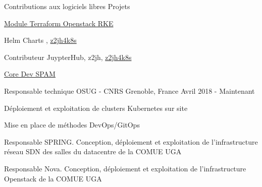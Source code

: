 

\begin{cventries}

  \cventry
    {Contributions aux logiciels libres} %
    {Projets}
    {}
    {}
    {
      \begin{cvitems} %
        \item {\href{https://github.com/remche/terraform-openstack-rke}{Module Terraform Openstack RKE \faGithub}}
        \item {Helm Charts \href{https://github.com/remche/zero-to-shinyproxy}, \href{https://github.com/remche/z2jh4k8s}{z2jh4k8s \faGithub}}
        \item {Contributeur JuypterHub, z2jh, \href{https://github.com/remche/z2jh4k8s}{z2jh4k8s \faGithub}}
        \item {\href{https://ttk.gricad-pages.univ-grenoble-alpes.fr/spam/intro.html}{Core Dev SPAM \faGlobe}}
      \end{cvitems}
    }

  \cventry
    {Responsable technique} %
    {OSUG - CNRS} %
    {Grenoble, France} %
    {Avril 2018 - Maintenant} %
    {
      \begin{cvitems} %
        \item {Déploiement et exploitation de clusters Kubernetes sur site}
        \item {Mise en place de méthodes DevOps/GitOps}
        \item {Responsable SPRING. Conception, déploiement et exploitation de l'infrastructure réseau SDN des salles du datacentre de la COMUE UGA}
        \item {Responsable Nova. Conception, déploiement et exploitation de l'infrastructure Openstack de la COMUE UGA}
      \end{cvitems}
    }


\end{cventries}
